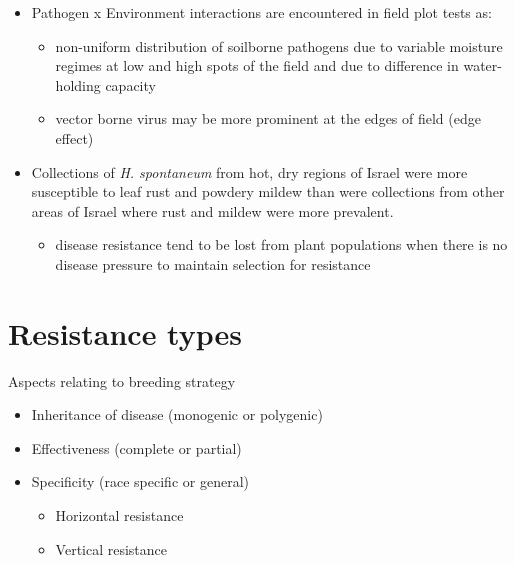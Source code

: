 \documentclass[11pt,dvipsnames,ignorenonframetext,aspectratio=169]{beamer}
\providecommand{\tightlist}{%
  \setlength{\itemsep}{0pt}\setlength{\parskip}{0pt}}
\begin{document}
\begin{frame}{}
\protect\hypertarget{section-11}{}
\begin{itemize}
\tightlist
\item
  Pathogen x Environment interactions are encountered in field plot
  tests as:

  \begin{itemize}
  \tightlist
  \item
    non-uniform distribution of soilborne pathogens due to variable
    moisture regimes at low and high spots of the field and due to
    difference in water-holding capacity
  \item
    vector borne virus may be more prominent at the edges of field (edge
    effect)
  \end{itemize}
\item
  Collections of \textit{H. spontaneum} from hot, dry regions of Israel
  were more susceptible to leaf rust and powdery mildew than were
  collections from other areas of Israel where rust and mildew were more
  prevalent.

  \begin{itemize}
  \tightlist
  \item
    disease resistance tend to be lost from plant populations when there
    is no disease pressure to maintain selection for resistance
  \end{itemize}
\end{itemize}
\end{frame}

\hypertarget{resistance-types}{%
\section{Resistance types}\label{resistance-types}}

\begin{frame}{Aspects relating to breeding strategy}
\protect\hypertarget{aspects-relating-to-breeding-strategy}{}
\begin{itemize}
\tightlist
\item
  Inheritance of disease (monogenic or polygenic)
\item
  Effectiveness (complete or partial)
\item
  Specificity (race specific or general)

  \begin{itemize}
  \tightlist
  \item
    Horizontal resistance
  \item
    Vertical resistance
  \end{itemize}
\end{itemize}
\end{frame}
\end{document}
